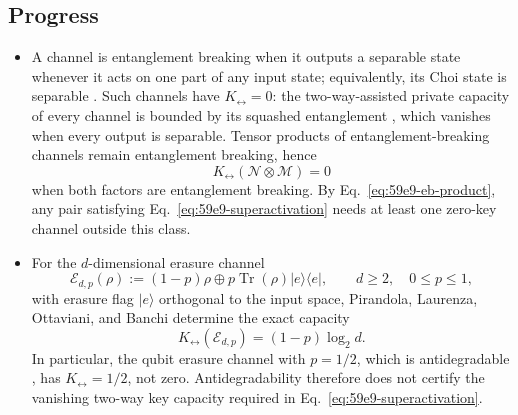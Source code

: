 \subsection*{Progress}

\begin{itemize}
  \item A channel is entanglement breaking when it outputs a separable state
  whenever it acts on one part of any input state; equivalently, its Choi
  state is separable .  Such channels have
  $K_{\leftrightarrow}=0$: the two-way-assisted private capacity of every
  channel is bounded by its squashed entanglement
  , which vanishes when every output is
  separable.  Tensor products of entanglement-breaking channels remain
  entanglement breaking, hence
  \begin{equation}
    K_{\leftrightarrow}(\mathcal N\otimes\mathcal M)=0
    \label{eq:59e9-eb-product}
  \end{equation}
  when both factors are entanglement breaking.  By
  Eq.~\eqref{eq:59e9-eb-product}, any pair satisfying
  Eq.~\eqref{eq:59e9-superactivation} needs at least one zero-key channel
  outside this class.

  \item For the $d$-dimensional erasure channel
  \begin{equation}
    \mathcal E_{d,p}(\rho):=(1-p)\rho\oplus p\operatorname{Tr}(\rho)|e\rangle\langle e|,
    \qquad d\geq2,\quad0\leq p\leq1,
    \label{eq:59e9-erasure}
  \end{equation}
  with erasure flag $|e\rangle$ orthogonal to the input space, Pirandola,
  Laurenza, Ottaviani, and Banchi determine the exact capacity
  \begin{equation}
    K_{\leftrightarrow}(\mathcal E_{d,p})=(1-p)\log_2d.
    \label{eq:59e9-erasure-key}
  \end{equation}
  In particular, the qubit erasure
  channel with $p=1/2$, which is antidegradable
  , has $K_{\leftrightarrow}=1/2$, not zero.
  Antidegradability therefore does not certify the vanishing two-way key
  capacity required in Eq.~\eqref{eq:59e9-superactivation}.


\end{itemize}
